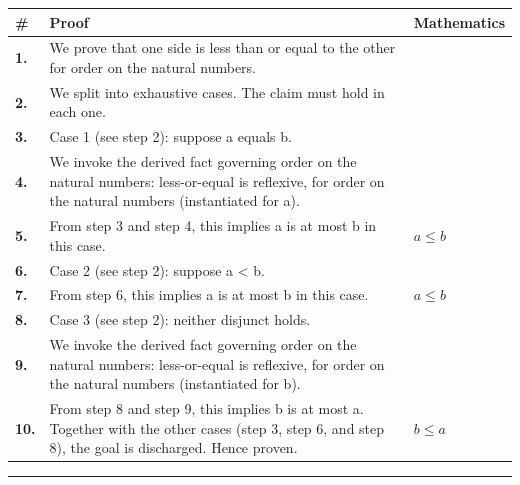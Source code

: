 \documentclass[11pt]{article}
\theoremstyle{definition}
\begin{document}
\begin{tabular}{@{} >{\raggedright\arraybackslash}p{} >{\raggedright\arraybackslash}p{} >{\raggedleft\arraybackslash}p{} @{}}
\textbf{\#} & \textbf{Proof} & \textbf{Mathematics} \\
\midrule
\textbf{1.} & We prove that one side is less than or equal to the other for order on the natural numbers. & \\[0.45em]
\textbf{2.} & We split into exhaustive cases. The claim must hold in each one. & \\[0.45em]
\textbf{3.} & Case 1 (see step 2): suppose a  equals  b. & \\[0.45em]
\textbf{4.} & We invoke the derived fact governing order on the natural numbers: less-or-equal is reflexive, for order on the natural numbers (instantiated for a). & \\[0.45em]
\textbf{5.} & From step 3 and step 4, this implies a is at most b in this case. & $\displaystyle a \le b$ \\[0.45em]
\textbf{6.} & Case 2 (see step 2): suppose a < b. & \\[0.45em]
\textbf{7.} & From step 6, this implies a is at most b in this case. & $\displaystyle a \le b$ \\[0.45em]
\textbf{8.} & Case 3 (see step 2): neither disjunct holds. & \\[0.45em]
\textbf{9.} & We invoke the derived fact governing order on the natural numbers: less-or-equal is reflexive, for order on the natural numbers (instantiated for b). & \\[0.45em]
\textbf{10.} & From step 8 and step 9, this implies b is at most a. Together with the other cases (step 3, step 6, and step 8), the goal is discharged. Hence proven. & $\displaystyle b \le a$ \\[0.45em]
\bottomrule
\end{tabular}
\label{thm:Nat-order-one_side_is_less_than_or_equal_to_the_other}
\par\medskip\hrule
\end{document}
